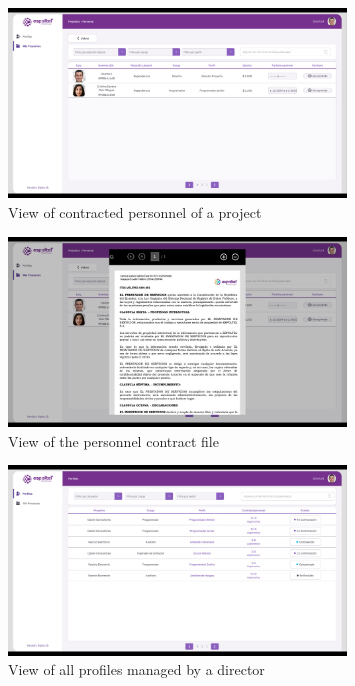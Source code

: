 \documentclass{scrreprt}
\begin{document}
\begin{figure}[H]
	\centering \small
	\includegraphics[width=0.8\textwidth]{WebPrototype/wflow-16.jpeg}
	\caption{View of contracted personnel of a project}
\end{figure}

\begin{figure}[H]
	\centering \small
	\includegraphics[width=0.8\textwidth]{WebPrototype/wflow-17.jpeg}
	\caption{View of the personnel contract file}
\end{figure}

\begin{figure}[H]
	\centering \small
	\includegraphics[width=0.8\textwidth]{WebPrototype/wflow-18.jpeg}
	\caption{View of all profiles managed by a director}
\end{figure}
\end{document}
